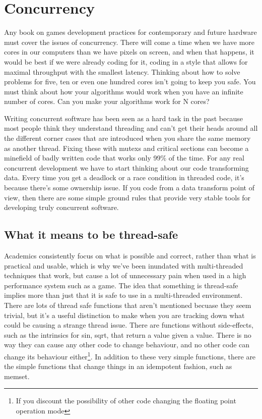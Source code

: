 \chapter{Concurrency}

Any book on games development practices for contemporary and future hardware
must cover the issues of concurrency. There will come a time when we have more
cores in our computers than we have pixels on screen, and when that happens, it
would be best if we were already coding for it, coding in a style that allows
for maximal throughput with the smallest latency. Thinking about how to solve
problems for five, ten or even one hundred cores isn't going to keep you safe.
You must think about how your algorithms would work when you have an infinite
number of cores. Can you make your algorithms work for N cores?

Writing concurrent software has been seen as a hard task in the past because
most people think they understand threading and can't get their heads around
all the different corner cases that are introduced when you share the same
memory as another thread. Fixing these with mutexs and critical sections can
become a minefield of badly written code that works only 99\% of the time. For
any real concurrent development we have to start thinking about our code
transforming data. Every time you get a deadlock or a race condition in
threaded code, it's because there's some ownership issue. If you code from a
data transform point of view, then there are some simple ground rules that
provide very stable tools for developing truly concurrent software.

\section[Thread-safe]{What it means to be thread-safe}

Academics consistently focus on what is possible and correct, rather than what
is practical and usable, which is why we've been inundated with multi-threaded
techniques that work, but cause a lot of unnecessary pain when used in a high
performance system such as a game. The idea that something is thread-safe
implies more than just that it is safe to use in a multi-threaded environment.
There are lots of thread safe functions that aren't mentioned becuase they seem
trivial, but it's a useful distinction to make when you are tracking down what
could be causing a strange thread issue. There are functions without
side-effects, such as the intrinsics for sin, sqrt, that return a value given a
value. There is no way they can cause any other code to change behaviour, and
no other code can change its behaviour either\footnote{If you discount the
possibility of other code changing the floating point operation mode}. In
addition to these very simple functions, there are the simple functions that
change things in an idempotent fashion, such as memset.

